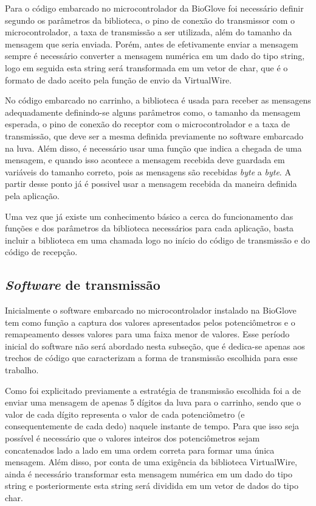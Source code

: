 \documentclass[
	12pt,				%
	openright,			%
	oneside,			%
	a4paper,			%
	english,			%
	brazil				%
	]{abntex2}
\begin{document}
		Para o código embarcado no microcontrolador da BioGlove foi necessário definir segundo os parâmetros da biblioteca, o pino de conexão do transmissor com o microcontrolador, a taxa de transmissão a ser utilizada, além do tamanho da mensagem que seria enviada. Porém, antes de efetivamente enviar a mensagem sempre é necessário converter a mensagem numérica em um dado do tipo string, logo em seguida esta string será transformada em um vetor de char, que é o formato de dado aceito pela função de envio da VirtualWire.

		No código embarcado no carrinho, a biblioteca é usada para receber as mensagens adequadamente definindo-se alguns parâmetros como, o tamanho da mensagem esperada, o pino de conexão do receptor com o microcontrolador e a taxa de transmissão, que deve ser a mesma definida previamente no software embarcado na luva. Além disso, é necessário usar uma função que indica a chegada de uma mensagem, e quando isso acontece a mensagem recebida deve guardada em variáveis do tamanho correto, pois as mensagens são recebidas \textit{byte} a \textit{byte}. A partir desse ponto já é possivel usar a mensagem recebida da maneira definida pela aplicação.

		Uma vez que já existe um conhecimento básico a cerca do funcionamento das funções e dos parâmetros da biblioteca necessários para cada aplicação, basta incluir a biblioteca em uma chamada logo no início do código de transmissão e do código de recepção.



		\subsection{\textit{Software} de transmissão}

		Inicialmente o software embarcado no microcontrolador instalado na BioGlove tem como função a captura dos valores apresentados pelos potenciômetros e o remapeamento desses valores para uma faixa menor de valores. Esse período inicial do software não será abordado nesta subseção, que é dedica-se apenas aos trechos de código que caracterizam a forma de transmissão escolhida para esse trabalho.

		Como foi explicitado previamente a estratégia de transmissão escolhida foi a de enviar uma mensagem de apenas 5 dígitos da luva para o carrinho, sendo que o valor de cada dígito representa o valor de cada potenciômetro (e consequentemente de cada dedo) naquele instante de tempo. Para que isso seja possível é necessário que o valores inteiros dos potenciômetros sejam concatenados lado a lado em uma ordem correta para formar uma única mensagem. Além disso, por conta de uma exigência da biblioteca VirtualWire, ainda é necessário transformar esta mensagem numérica em um dado do tipo string e posteriormente esta string será dividida em um vetor de dados do tipo char.	
		
\end{document}
